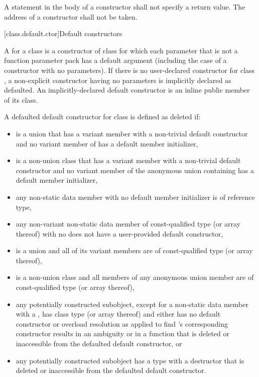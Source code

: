 \pnum
{}%
A
statement in the body of a constructor shall not specify a return value.
%
The address of a constructor shall not be taken.

[class.default.ctor]{Default constructors}

\pnum
{}%
%
A  for a class 
is a constructor of class 
for which each parameter
that is not a function parameter pack
has a default argument
(including the case of a constructor with no parameters).
%
If there is no user-declared constructor for class
,
a non-explicit constructor having no parameters is implicitly declared
as defaulted.
An implicitly-declared default constructor is an
inline public member of its class.

\pnum
A defaulted default constructor for class  is defined as deleted if:

\begin{itemize}
\item {} is a union that has a variant member
with a non-trivial default constructor and
no variant member of  has a default member initializer,

\item {} is a non-union class that has a variant member 
with a non-trivial default constructor and
no variant member of the anonymous union containing 
has a default member initializer,

\item any non-static data member with no default member initializer is
of reference type,

\item any non-variant non-static data member of const-qualified type (or array
thereof) with no  does not have a user-provided default constructor,

\item {} is a union and all of its variant members are of const-qualified
type (or array thereof),

\item {} is a non-union class and all members of any anonymous union member are
of const-qualified type (or array thereof),

\item any potentially constructed subobject, except for a non-static data member
with a , has
class type  (or array thereof) and either 
has no default constructor or overload resolution
as applied to find 's corresponding
constructor results in an ambiguity or in a function that is deleted or
inaccessible from the defaulted default constructor, or

\item any potentially constructed subobject has a type
with a destructor that is deleted or inaccessible from the defaulted default
constructor.
\end{itemize}

